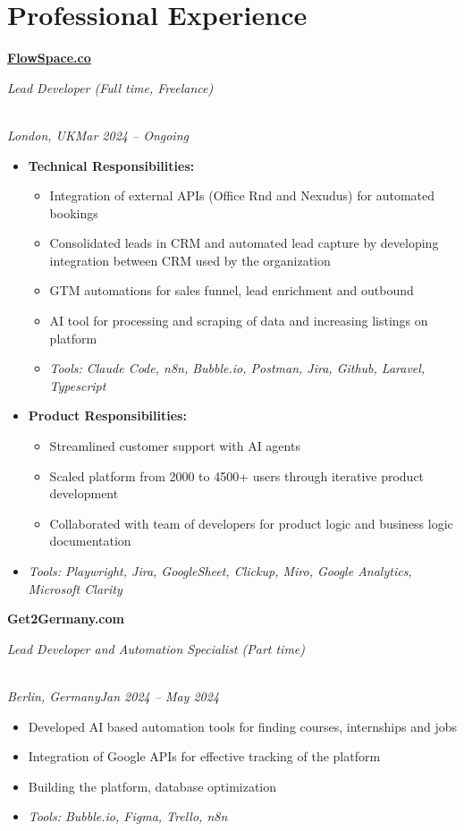 \documentclass[a4paper,10pt]{article}
\newcommand{\role}[4]{\vspace{3pt}\noindent\hspace{0.6em}\parbox[t]{0.38\textwidth}{\raggedright\textbf{#1}}\hfill\parbox[t]{0.58\textwidth}{\raggedleft\textit{#2}}\\{\textit{#3}\hfill\textit{#4}}\vspace{1pt}}
\begin{document}
\section{Professional Experience}
\role{\href{https://flowspace.co}{FlowSpace.co}}{Lead Developer (Full time, Freelance)}{London, UK}{Mar 2024 -- Ongoing}
\begin{itemize}
\item \textbf{Technical Responsibilities:}
\begin{itemize}[label=--]
\item Integration of external APIs (Office Rnd and Nexudus) for automated bookings
\item Consolidated leads in CRM and automated lead capture by developing integration between CRM used by the organization
\item GTM automations for sales funnel, lead enrichment and outbound
\item AI tool for processing and scraping of data and increasing listings on platform
\item \textit{Tools: Claude Code, n8n, Bubble.io, Postman, Jira, Github, Laravel, Typescript}
\end{itemize}
\item \textbf{Product Responsibilities:}
\begin{itemize}[label=--]
\item Streamlined customer support with AI agents
\item Scaled platform from 2000 to 4500+ users through iterative product development
\item Collaborated with team of developers for product logic and business logic documentation
\end{itemize}
\item \textit{Tools: Playwright, Jira, GoogleSheet, Clickup, Miro, Google Analytics, Microsoft Clarity}
\end{itemize}

\role{Get2Germany.com}{Lead Developer and Automation Specialist (Part time)}{Berlin, Germany}{Jan 2024 -- May 2024}
\begin{itemize}
\item Developed AI based automation tools for finding courses, internships and jobs
\item Integration of Google APIs for effective tracking of the platform
\item Building the platform, database optimization
\item \textit{Tools: Bubble.io, Figma, Trello, n8n}
\end{itemize}
\end{document}
